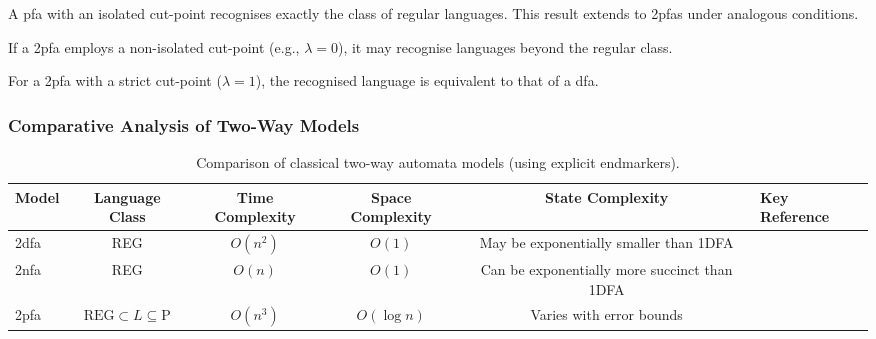 \begin{theorem}
\label{thm:2pfa-rabin}
A \gls{pfa} with an isolated cut-point recognises exactly the class of regular languages. This result extends to \glspl{2pfa} under analogous conditions.
\end{theorem}

\begin{proposition}
If a \gls{2pfa} employs a non-isolated cut-point (e.g., \(\lambda = 0\)), it may recognise languages beyond the regular class.
\end{proposition}

\begin{corollary}
For a \gls{2pfa} with a strict cut-point (\(\lambda = 1\)), the recognised language is equivalent to that of a \gls{dfa}.
\end{corollary}


\subsubsection{Comparative Analysis of Two-Way Models}
\label{subsubsec:two-way-comparison}

\begin{table}[h]
    \centering
    \begin{adjustbox}{max width=\textwidth}
    \begin{tabular}{|l|c|c|c|c|l|}
        \hline
        \textbf{Model} & \textbf{Language Class} & \textbf{Time Complexity} & \textbf{Space Complexity} & \textbf{State Complexity} & \textbf{Key Reference} \\
        \hline
        \gls{2dfa}  & REG & \(O(n^2)\) & \(O(1)\) & May be exponentially smaller than 1DFA & \cite{hopcroft2006introduction} \\
        \gls{2nfa}  & REG & \(O(n)\) & \(O(1)\) & Can be exponentially more succinct than 1DFA & \cite{yakaryilmaz2010succinctness} \\
        \gls{2pfa}  & \( \mbox{REG} \subset L \subseteq \mbox{P} \) & \(O(n^3)\) & \(O(\log n)\) & Varies with error bounds & \cite{freivalds1981probabilistic} \\
        \hline
    \end{tabular}
    \end{adjustbox}
    \caption{Comparison of classical two-way automata models (using explicit endmarkers).}
    \label{tab:two-way-comparison}
\end{table}

